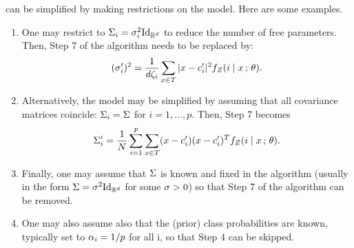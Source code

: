 \begin{remark}
\label{rem:mog}
 can be simplified by making restrictions on the model. Here are some examples.
\begin{enumerate}[label=(\roman*)]
\item One may restrict to $\Sig_i = \sig^2_i \Id[d]$ to reduce the number of free parameters. Then, Step 7 of the algorithm needs to be replaced   by:
\[
(\sigma'_i)^2 = \frac{1}{d\zeta_i} \sum_{x\in T} |x - c'_i|^2 f_Z(i\mid x\,;\,\theta).
\]
\item Alternatively, the model may be simplified by assuming that all covariance matrices coincide: $\Sigma_i = \Sigma$ for $i=1, \ldots, p$. Then, Step 7 becomes
\[
\Sigma'_i = \frac{1}{N} \sum_{i=1}^p \sum_{x\in T} (x - c'_i)(x-c'_i)^T f_Z(i\mid x\,;\,\theta).
\]
\item Finally, one may assume that $\Sigma$ is known and fixed in the algorithm (usually in the form $\Sig = \sig^2\Id[d]$ for some $\sigma>0$) so that Step 7 of the algorithm can be removed.
\item One may also assume also that the (prior) class probabilities are known, typically set to $\alpha_i = 1/p$ for all i, so that Step 4 can be skipped.

\end{enumerate}
\end{remark}

